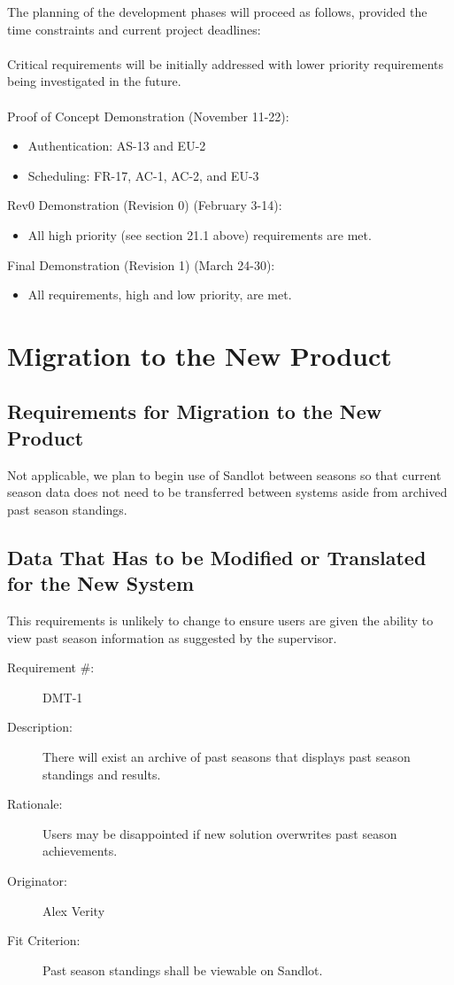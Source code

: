 \documentclass[12pt]{article}
\newenvironment{myreq}[1]{%
\setlist[description]{font=\normalfont\color{darkgray}}%
\begin{tcolorbox}[colframe=black,colback=white, sharp corners, boxrule=1pt]%
\bfseries\color{blue}%
\begin{description}#1}%
{\end{description}\end{tcolorbox}}
\newcommand{\twoinline}[2]{\begin{multicols}{2}#1 #2\end{multicols}}
\newcommand{\reqno}{\item[Requirement \#:]}
\newcommand{\reqdesc}{\item[Description:]}
\newcommand{\reqrat}{\item[Rationale:]}
\newcommand{\reqorig}{\item[Originator:]}
\newcommand{\reqfit}{\item[Fit Criterion:]}
\newcommand{\reqsatis}{\item[Customer Satisfaction:]}
\newcommand{\reqdissat}{\item[Customer Dissatisfaction:]}
\begin{document}
The planning of the development phases will proceed as follows, provided the time
constraints and current project deadlines: \\\\
Critical requirements will be initially addressed with lower priority requirements
being investigated in the future. \\\\

Proof of Concept Demonstration (November 11-22):
\begin{itemize}
  \item Authentication: AS-13 and EU-2
  \item Scheduling: FR-17, AC-1, AC-2, and EU-3
\end{itemize}

Rev0 Demonstration (Revision 0) (February 3-14):
\begin{itemize}
  \item All high priority (see section 21.1 above) requirements are met.
\end{itemize}

Final Demonstration (Revision 1) (March 24-30):
\begin{itemize}
  \item All requirements, high and low priority, are met.
\end{itemize}

\section{Migration to the New Product}
\subsection{Requirements for Migration to the New Product}
Not applicable, we plan to begin use of Sandlot between seasons so that
current season data does not need to be transferred between systems aside from
archived past season standings.

\subsection{Data That Has to be Modified or Translated for the New System}

This requirements is unlikely to change to ensure users are given the ability to view
past season information as suggested by the supervisor. 

\begin{myreq}
  \reqno DMT-1
  \reqdesc There will exist an archive of past seasons that displays past
  season standings and results.
  \reqrat Users may be disappointed if new solution overwrites past season
  achievements.
  \reqorig Alex Verity
  \reqfit Past season standings shall be viewable on Sandlot.
  \twoinline
    {\reqsatis 1}
    {\reqdissat 2}
\end{myreq}
\end{document}

